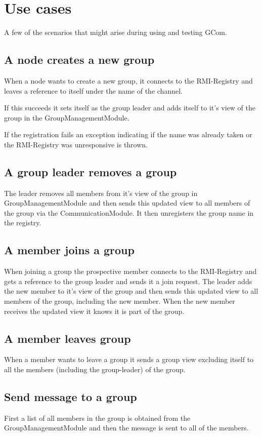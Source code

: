 \documentclass[english]{article}
\begin{document}
\section{Use cases}

A few of the scenarios that might arise during using and testing GCom.

\subsection{A node creates a new group}
When a node wants to create a new group, it connects to the RMI-Registry and leaves a reference to itself under the name of the channel.

If this succeeds it sets itself as the group leader and adds itself to it's view of the group in the GroupManagementModule.

If the registration fails an exception indicating if the name was already taken or the RMI-Registry was unresponsive is thrown.

\subsection{A group leader removes a group}
The leader removes all members from it's view of the group in GroupManagementModule and then sends this updated view to all members of the group via the CommunicationModule. It then unregisters the group name in the registry.

\subsection{A member joins a group}
When joining a group the prospective member connects to the RMI-Registry and gets a reference to the group leader and sends it a join request. The leader adds the new member to it's view of the group and then sends this updated view to all members of the group, including the new member. When the new member receives the updated view it knows it is part of the group.

\subsection{A member leaves group}
When a member wants to leave a group it sends a group view excluding itself to all the members (including the group-leader) of the group.

\subsection{Send message to a group}
First a list of all members in the group is obtained from the GroupManagementModule and then the message is sent to all of the members.
\end{document}
